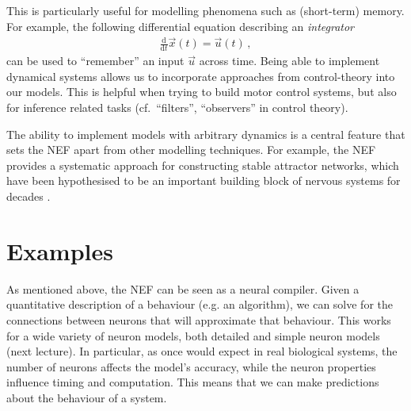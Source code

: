\documentclass[10pt,letterpaper,oneside]{article}
\begin{document}
This is particularly useful for modelling phenomena such as (short-term) memory. For example, the following differential equation describing an \emph{integrator}
\begin{align*}
	\frac{\mathrm{d}}{\mathrm{d}t} \vec x(t) = \vec u(t) \,,
\end{align*}
can be used to \enquote{remember} an input $\vec u$ across time. Being able to implement dynamical systems allows us to incorporate approaches from control-theory into our models. This is helpful when trying to build motor control systems, but also for inference related tasks (cf.~\enquote{filters}, \enquote{observers} in control theory).

The ability to implement models with arbitrary dynamics is a central feature that sets the NEF apart from other modelling techniques. For example, the NEF provides a systematic approach for constructing stable attractor networks, which have been hypothesised to be an important building block of nervous systems for decades \cite{eliasmith2005unified}.


\section{Examples}
\label{sec:examples}

As mentioned above, the NEF can be seen as a neural compiler. Given a quantitative description of a behaviour (e.g. an algorithm), we can solve for the connections between neurons that will approximate that behaviour. This works for a wide variety of neuron models, both detailed and simple neuron models (next lecture). In particular, as once would expect in real biological systems, the number of neurons affects the model's accuracy, while the neuron properties influence timing and computation. This means that we can make predictions about the behaviour of a system.
\end{document}
